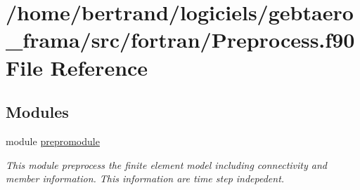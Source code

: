 \hypertarget{_preprocess_8f90}{}\section{/home/bertrand/logiciels/gebtaero\+\_\+frama/src/fortran/\+Preprocess.f90 File Reference}
\label{_preprocess_8f90}
\subsection*{Modules}
\begin{DoxyCompactItemize}
\item 
module \hyperlink{namespaceprepromodule}{prepromodule}
\begin{DoxyCompactList}\small\item\em This module preprocess the finite element model including connectivity and member information. This information are time step indepedent. \end{DoxyCompactList}\end{DoxyCompactItemize}
